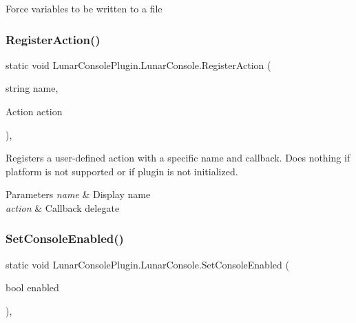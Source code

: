 Force variables to be written to a file 

\mbox{\label{class_lunar_console_plugin_1_1_lunar_console_acef4779357950452589fe76b8a8b4048}} 
\subsubsection{\texorpdfstring{Register\+Action()}{RegisterAction()}}
{\footnotesize\ttfamily static void Lunar\+Console\+Plugin.\+Lunar\+Console.\+Register\+Action (\begin{DoxyParamCaption}\item[{string}]{name,  }\item[{Action}]{action }\end{DoxyParamCaption})\hspace{0.3cm}{\ttfamily [inline]}, {\ttfamily [static]}}



Registers a user-\/defined action with a specific name and callback. Does nothing if platform is not supported or if plugin is not initialized. 


\begin{DoxyParams}{Parameters}
{\em name} & Display name\\
\hline
{\em action} & Callback delegate\\
\hline
\end{DoxyParams}
\mbox{\label{class_lunar_console_plugin_1_1_lunar_console_aba91fb5819fc8059c33076d1b7e96966}} 
\subsubsection{\texorpdfstring{Set\+Console\+Enabled()}{SetConsoleEnabled()}}
{\footnotesize\ttfamily static void Lunar\+Console\+Plugin.\+Lunar\+Console.\+Set\+Console\+Enabled (\begin{DoxyParamCaption}\item[{bool}]{enabled }\end{DoxyParamCaption})\hspace{0.3cm}{\ttfamily [inline]}, {\ttfamily [static]}}



